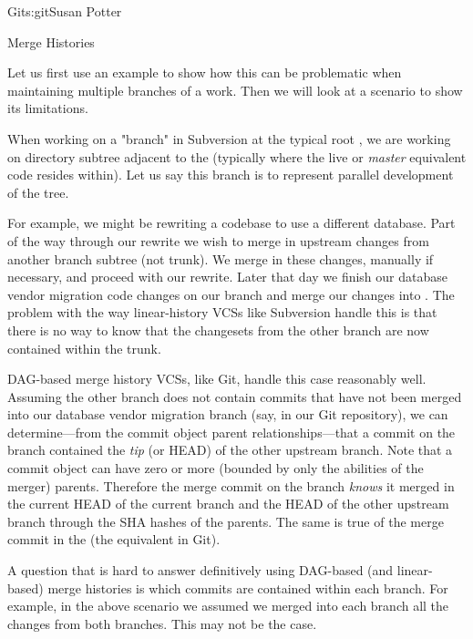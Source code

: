 \begin{aosachapter}{Git}{s:git}{Susan Potter}
\begin{aosasect1}{Merge Histories}

Let us first use an example to show how this can be problematic when
maintaining multiple branches of a work. Then we will look at a scenario to
show its limitations.

When working on a "branch" in Subversion at the typical root
, we are working on directory subtree adjacent to
the  (typically where the live or \emph{master} equivalent code
resides within). Let us say this branch is to represent parallel development
of the  tree.

For example,
we might be rewriting a codebase to use a different database. Part of the
way through our rewrite we wish to merge in upstream changes from another
branch subtree (not trunk). We merge in these changes, manually if necessary,
and proceed with our rewrite. Later that day we finish our database vendor
migration code changes on our  branch and merge
our changes into . The problem with the way linear-history VCSs
like Subversion handle this is that there is no way to know that the
changesets from the other branch are now contained within the trunk.

DAG-based merge history VCSs, like Git, handle this case reasonably well.
Assuming the other branch does not contain commits that have not been merged
into our database vendor migration branch (say,  in our
Git repository), we can determine---from the commit object parent
relationships---that a commit on the  branch contained
the \emph{tip} (or HEAD) of the other upstream branch. Note that a commit
object can have zero or more (bounded by only the abilities of the merger)
parents. Therefore the merge commit on the  branch
\emph{knows} it merged in the current HEAD of the current branch and the
HEAD of the other upstream branch through the SHA hashes of the parents.
The same is true of the merge commit in the  (the 
equivalent in Git).

A question that is hard to answer definitively using DAG-based (and linear-based) 
merge histories is which commits are contained within each branch. For
example, in the above scenario we assumed we merged into each branch all
the changes from both branches. This may not be the case.


\end{aosasect1}
\end{aosachapter}
